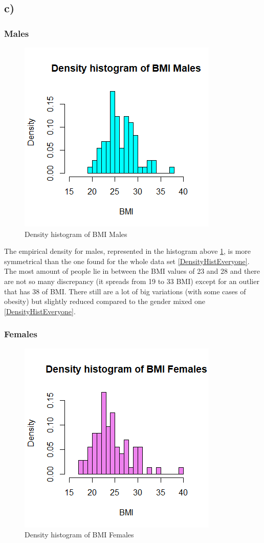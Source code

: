 \subsection{c)}
\subsubsection{Males}
\begin{figure}[ht]
    \centering
    \includegraphics{root/Rplot2male.png}
    \caption{Density histogram of BMI Males}
    \label{DensityHistMale}
\end{figure}
The empirical density for males, represented in the histogram above \ref{DensityHistMale}, is more symmetrical than the one found for the whole data set \ref{DensityHistEveryone}. The most amount of people lie in between the BMI values of 23 and 28 and there are not so many discrepancy (it spreads from 19 to 33 BMI) except for an outlier that has 38 of BMI. There still are a lot of big variations (with some cases of obesity) but slightly reduced compared to the gender mixed one \ref{DensityHistEveryone}.
\newpage
\subsubsection{Females}
\begin{figure}[h!]
    \centering
    \includegraphics{root/Rplot2female.png}
    \caption{Density histogram of BMI Females}
    \label{DensityHistFemale}
\end{figure}

